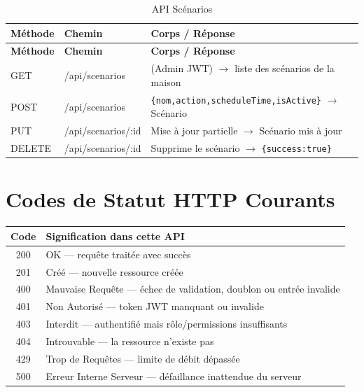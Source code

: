 \begin{longtable}{p{} p{} p{}}
\caption{API Scénarios}\label{tab:api_scenarios}\\
\toprule
\textbf{Méthode} & \textbf{Chemin} & \textbf{Corps / Réponse} \\
\midrule
\endfirsthead
\toprule
\textbf{Méthode} & \textbf{Chemin} & \textbf{Corps / Réponse} \\
\midrule
\endhead
\bottomrule
\endfoot
GET    & /api/scenarios     & (Admin JWT) $\to$ liste des scénarios de la maison \\
POST   & /api/scenarios     & \texttt{\{nom,action,scheduleTime,isActive\}} $\to$ Scénario \\
PUT    & /api/scenarios/:id & Mise à jour partielle $\to$ Scénario mis à jour \\
DELETE & /api/scenarios/:id & Supprime le scénario $\to$ \texttt{\{success:true\}} \\
\end{longtable}

\section{Codes de Statut HTTP Courants}

\begin{center}
\begin{tabular}{cl}
\toprule
\textbf{Code} & \textbf{Signification dans cette API} \\
\midrule
200 & OK --- requête traitée avec succès \\
201 & Créé --- nouvelle ressource créée \\
400 & Mauvaise Requête --- échec de validation, doublon ou entrée invalide \\
401 & Non Autorisé --- token JWT manquant ou invalide \\
403 & Interdit --- authentifié mais rôle/permissions insuffisants \\
404 & Introuvable --- la ressource n'existe pas \\
429 & Trop de Requêtes --- limite de débit dépassée \\
500 & Erreur Interne Serveur --- défaillance inattendue du serveur \\
\bottomrule
\end{tabular}
\end{center}
